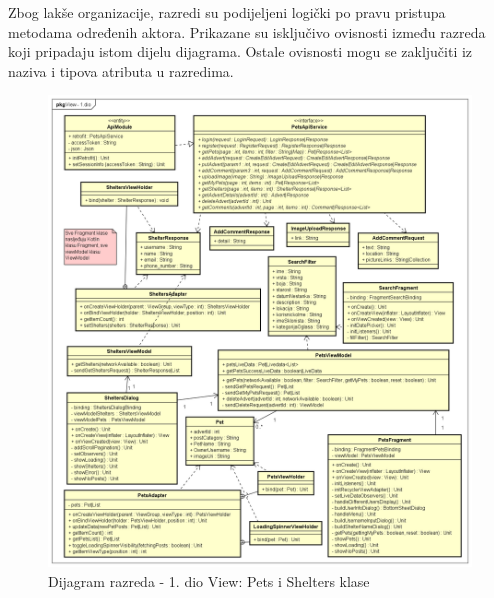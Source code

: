 			Zbog lakše organizacije, razredi su podijeljeni logički po pravu pristupa metodama određenih aktora. Prikazane su isključivo ovisnosti između razreda koji pripadaju istom dijelu dijagrama. Ostale ovisnosti mogu se zaključiti iz naziva i tipova atributa u razredima.

			\begin{figure}[H]
				\includegraphics[scale=0.48]{dijagrami/dijagramiRazreda/View1.PNG} %
				\centering
				\caption{Dijagram razreda - 1. dio View: Pets i Shelters klase}
				\label{fig:drView1}
			\end{figure}

